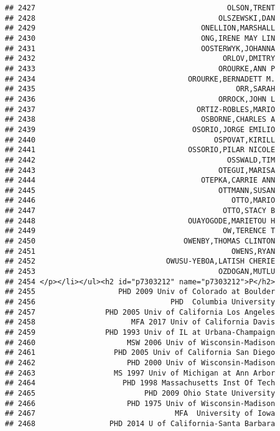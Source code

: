 \documentclass[
]{article}
\begin{document}
\begin{verbatim}
## 2427                                            OLSON,TRENT
## 2428                                          OLSZEWSKI,DAN
## 2429                                      ONELLION,MARSHALL
## 2430                                      ONG,IRENE MAY LIN
## 2431                                      OOSTERWYK,JOHANNA
## 2432                                           ORLOV,DMITRY
## 2433                                          OROURKE,ANN P
## 2434                                   OROURKE,BERNADETT M.
## 2435                                              ORR,SARAH
## 2436                                          ORROCK,JOHN L
## 2437                                     ORTIZ-ROBLES,MARIO
## 2438                                      OSBORNE,CHARLES A
## 2439                                    OSORIO,JORGE EMILIO
## 2440                                         OSPOVAT,KIRILL
## 2441                                   OSSORIO,PILAR NICOLE
## 2442                                            OSSWALD,TIM
## 2443                                          OTEGUI,MARISA
## 2444                                      OTEPKA,CARRIE ANN
## 2445                                          OTTMANN,SUSAN
## 2446                                             OTTO,MARIO
## 2447                                           OTTO,STACY B
## 2448                                   OUAYOGODE,MARIETOU H
## 2449                                           OW,TERENCE T
## 2450                                  OWENBY,THOMAS CLINTON
## 2451                                             OWENS,RYAN
## 2452                              OWUSU-YEBOA,LATISH CHERIE
## 2453                                          OZDOGAN,MUTLU
## 2454 </p></li></ul><h2 id="p7303212" name="p7303212">P</h2>
## 2455                   PHD 2009 Univ of Colorado at Boulder
## 2456                               PHD  Columbia University
## 2457                PHD 2005 Univ of California Los Angeles
## 2458                      MFA 2017 Univ of California Davis
## 2459                PHD 1993 Univ of IL at Urbana-Champaign
## 2460                     MSW 2006 Univ of Wisconsin-Madison
## 2461                  PHD 2005 Univ of California San Diego
## 2462                     PHD 2000 Univ of Wisconsin-Madison
## 2463                  MS 1997 Univ of Michigan at Ann Arbor
## 2464                    PHD 1998 Massachusetts Inst Of Tech
## 2465                         PHD 2009 Ohio State University
## 2466                     PHD 1975 Univ of Wisconsin-Madison
## 2467                                MFA  University of Iowa
## 2468                 PHD 2014 U of California-Santa Barbara

\end{verbatim}
\end{document}
